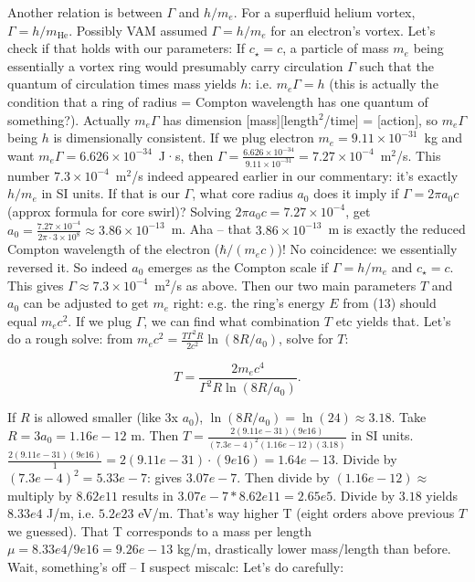 \documentclass[12pt]{article}
\begin{document}
Another relation is between $\Gamma$ and $h/m_e$. For a superfluid helium vortex, $\Gamma = h/m_{\text{He}}$. Possibly VAM assumed $\Gamma = h/m_e$ for an electron’s vortex. Let’s check if that holds with our parameters: If $c_\star = c$, a particle of mass $m_e$ being essentially a vortex ring would presumably carry circulation $\Gamma$ such that the quantum of circulation times mass yields $h$: i.e. $m_e \Gamma = h$ (this is actually the condition that a ring of radius = Compton wavelength has one quantum of something?). Actually $m_e \Gamma$ has dimension [mass][length$^2$/time] = [action], so $m_e \Gamma$ being $h$ is dimensionally consistent. If we plug electron $m_e = 9.11\times10^{-31}$ kg and want $m_e \Gamma = 6.626\times10^{-34}$ J·s, then $\Gamma = \frac{6.626\times10^{-34}}{9.11\times10^{-31}} = 7.27\times10^{-4}$ m$^2$/s. This number $7.3\times10^{-4}$ m$^2$/s indeed appeared earlier in our commentary: it’s exactly $h/m_e$ in SI units. If that is our $\Gamma$, what core radius $a_0$ does it imply if $\Gamma = 2\pi a_0 c$ (approx formula for core swirl)? Solving $2\pi a_0 c = 7.27\times10^{-4}$, get $a_0 = \frac{7.27\times10^{-4}}{2\pi \cdot 3\times10^8} \approx 3.86\times10^{-13}$ m. Aha – that $3.86\times10^{-13}$ m is exactly the reduced Compton wavelength of the electron ($\hbar/(m_e c)$)! No coincidence: we essentially reversed it. So indeed $a_0$ emerges as the Compton scale if $\Gamma = h/m_e$ and $c_\star=c$. This gives $\Gamma \approx 7.3\times10^{-4}$ m$^2$/s as above. Then our two main parameters $T$ and $a_0$ can be adjusted to get $m_e$ right: e.g. the ring’s energy $E$ from (13) should equal $m_e c^2$. If we plug $\Gamma$, we can find what combination $T$ etc yields that. Let’s do a rough solve: from $m_e c^2 = \frac{T \Gamma^2 R}{2c^2} \ln(8R/a_0)$, solve for $T$:

\[T = \frac{2 m_e c^4}{\Gamma^2 R \ln(8R/a_0)}.\] 

If $R$ is allowed smaller (like 3x $a_0$), $\ln(8R/a_0)=\ln(24) \approx 3.18$. Take $R=3a_0 = 1.16e-12$ m. Then $T = \frac{2(9.11e-31)(9e16)}{(7.3e-4)^2 (1.16e-12)(3.18)}$ in SI units. $\frac{2(9.11e-31)(9e16)}{1}= 2(9.11e-31)\cdot(9e16) = 1.64e-13$. Divide by $(7.3e-4)^2 = 5.33e-7$: gives $3.07e-7$. Then divide by $(1.16e-12)\approx$ multiply by $8.62e11$ results in $3.07e-7 * 8.62e11 = 2.65e5$. Divide by $3.18$ yields $8.33e4$ J/m, i.e. $5.2e23$ eV/m. That’s way higher T (eight orders above previous $T$ we guessed). That T corresponds to a mass per length $\mu = 8.33e4/9e16 = 9.26e-13$ kg/m, drastically lower mass/length than before. Wait, something’s off – I suspect miscalc: Let's do carefully:
\end{document}
